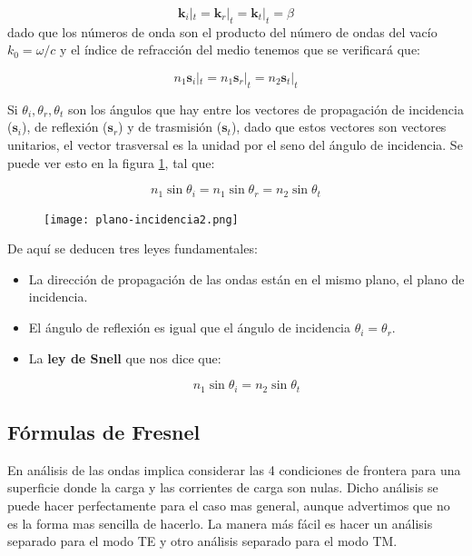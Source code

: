 \documentclass[12pt]{article}
\newcommand{\kn}{\mathbf{k}}
\newcommand{\sn}{\mathbf{s}}
\numberwithin{equation}{section}
\numberwithin{figure}{section}
\begin{document}
\begin{equation}
\kn_i |_t = \kn_r |_t = \kn_t |_t = \beta \label{Ec:6.2.0.07}
\end{equation}
dado que los números de onda son el producto del número de ondas del vacío $k_0 = \omega/c$  y el índice de refracción del medio tenemos que se verificará que:

\begin{equation}
n_ 1 \sn_i |_t = n_1 \sn_r |_t = n_2 \sn_t |_t 
\end{equation}

Si $\theta_i,\theta_r,\theta_t$ son los ángulos que hay entre los vectores de propagación de incidencia ($\sn_i$), de reflexión ($\sn_r$) y de trasmisión ($\sn_t$), dado que estos vectores son vectores unitarios, el vector trasversal es la unidad por el seno del ángulo de incidencia. Se puede ver esto en la figura \ref{Fig:6.1.002}, tal que:

\begin{equation}
n_1 \sin \theta_i = 
n_1 \sin \theta_r = 
n_2 \sin \theta_t 
\end{equation}


\begin{figure}[h!] \centering
\texttt{[image: plano-incidencia2.png]}
\caption{}
\label{Fig:6.1.002}
\end{figure} 

De aquí se deducen tres leyes fundamentales:

\begin{itemize}
\item La dirección de propagación de las ondas están en el mismo plano, el plano de incidencia.
\item El ángulo de reflexión es igual que el ángulo de incidencia $\theta_i = \theta_r$.
\item La \textbf{ley de Snell} que nos dice que: 

\begin{equation} 
n_1 \sin \theta_i = n_2 \sin \theta_t \label{Ec:6.1.003}
\end{equation}

\end{itemize}

\subsection{Fórmulas de Fresnel}
En análisis de las ondas implica considerar las 4 condiciones de frontera para una superficie donde la carga y las corrientes de carga son nulas. Dicho análisis se puede hacer perfectamente para el caso mas general, aunque advertimos que no es la forma mas sencilla de hacerlo. La manera más fácil es hacer un análisis separado para el modo TE y otro análisis separado para el modo TM. \\
\end{document}
